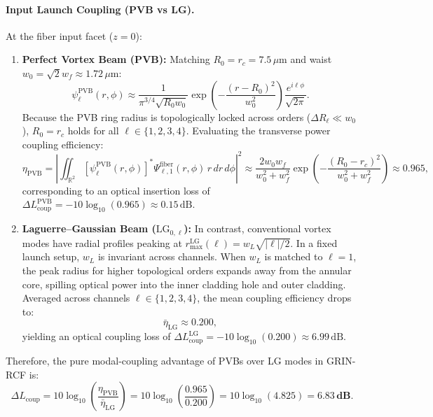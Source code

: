 \documentclass[11pt,a4paper]{article}
\begin{document}
\paragraph{Input Launch Coupling (PVB vs LG).}
At the fiber input facet ($z = 0$):
\begin{enumerate}
    \item \textbf{Perfect Vortex Beam (PVB):} Matching $R_0 = r_c = 7.5\,\mu\text{m}$ and waist $w_0 = \sqrt{2} w_f \approx 1.72\,\mu\text{m}$:
    \begin{equation}
    \psi_\ell^{\text{PVB}}(r, \phi) \approx \frac{1}{\pi^{3/4} \sqrt{R_0 w_0}} \exp\left( - \frac{(r - R_0)^2}{w_0^2} \right) \frac{e^{i \ell \phi}}{\sqrt{2\pi}}.
    \label{eq:pvb_input}
    \end{equation}
    Because the PVB ring radius is topologically locked across orders ($\Delta R_\ell \ll w_0$), $R_0 = r_c$ holds for all $\ell \in \{1, 2, 3, 4\}$. Evaluating the transverse power coupling efficiency:
    \begin{equation}
    \eta_{\text{PVB}} = \left| \iint_{\mathbb{R}^2} [\psi_\ell^{\text{PVB}}(r, \phi)]^* \Psi_{\ell, 1}^{\text{fiber}}(r, \phi) \, r \, dr \, d\phi \right|^2 \approx \frac{2 w_0 w_f}{w_0^2 + w_f^2} \exp\left( - \frac{(R_0 - r_c)^2}{w_0^2 + w_f^2} \right) \approx 0.965,
    \label{eq:pvb_coupling_integral}
    \end{equation}
    corresponding to an optical insertion loss of $\Delta L_{\text{coup}}^{\text{PVB}} = -10 \log_{10}(0.965) \approx 0.15\,\text{dB}$.
    \item \textbf{Laguerre--Gaussian Beam ($\text{LG}_{0, \ell}$):} In contrast, conventional vortex modes have radial profiles peaking at $r_{\max}^{\text{LG}}(\ell) = w_L \sqrt{|\ell|/2}$. In a fixed launch setup, $w_L$ is invariant across channels. When $w_L$ is matched to $\ell=1$, the peak radius for higher topological orders expands away from the annular core, spilling optical power into the inner cladding hole and outer cladding. Averaged across channels $\ell \in \{1, 2, 3, 4\}$, the mean coupling efficiency drops to:
    \begin{equation}
    \bar{\eta}_{\text{LG}} \approx 0.200,
    \label{eq:lg_mean_coupling}
    \end{equation}
    yielding an optical coupling loss of $\Delta L_{\text{coup}}^{\text{LG}} = -10 \log_{10}(0.200) \approx 6.99\,\text{dB}$.
\end{enumerate}
Therefore, the pure modal-coupling advantage of PVBs over LG modes in GRIN-RCF is:
\begin{equation}
\boxed{\Delta L_{\text{coup}} = 10 \log_{10}\left( \frac{\eta_{\text{PVB}}}{\bar{\eta}_{\text{LG}}} \right) = 10 \log_{10}\left( \frac{0.965}{0.200} \right) = 10 \log_{10}(4.825) = \mathbf{6.83\,\text{dB}}.}
\label{eq:coupling_advantage_db}
\end{equation}
\end{document}

